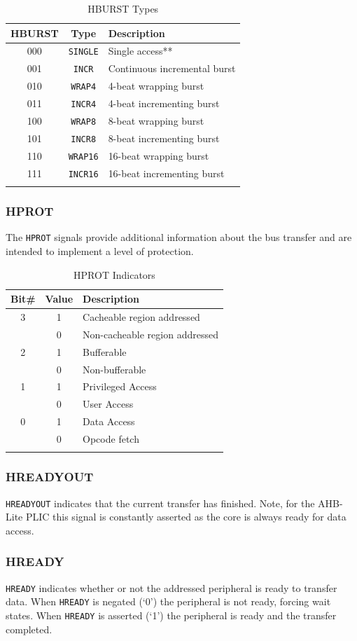 \documentclass[]{article}
\begin{document}
\begin{longtable}[]{@{}ccl@{}}
\toprule
\textbf{HBURST} & \textbf{Type} & \textbf{Description}\tabularnewline
\midrule
\endhead
000 & \texttt{SINGLE} & Single access**\tabularnewline
001 & \texttt{INCR} & Continuous incremental burst\tabularnewline
010 & \texttt{WRAP4} & 4-beat wrapping burst\tabularnewline
011 & \texttt{INCR4} & 4-beat incrementing burst\tabularnewline
100 & \texttt{WRAP8} & 8-beat wrapping burst\tabularnewline
101 & \texttt{INCR8} & 8-beat incrementing burst\tabularnewline
110 & \texttt{WRAP16} & 16-beat wrapping burst\tabularnewline
111 & \texttt{INCR16} & 16-beat incrementing burst\tabularnewline
\bottomrule
\caption{HBURST Types}
\label{tab:HBURST}
\end{longtable}

\subsubsection{HPROT}

The \texttt{HPROT} signals provide additional information about the bus
transfer and are intended to implement a level of protection.

\begin{longtable}[]{@{}ccl@{}}
\toprule
\textbf{Bit\#} & \textbf{Value} & \textbf{Description}\tabularnewline
\midrule
\endhead
3 & 1 & Cacheable region addressed\tabularnewline
& 0 & Non-cacheable region addressed\tabularnewline
2 & 1 & Bufferable\tabularnewline
& 0 & Non-bufferable\tabularnewline
1 & 1 & Privileged Access\tabularnewline
& 0 & User Access\tabularnewline
0 & 1 & Data Access\tabularnewline
& 0 & Opcode fetch\tabularnewline
\bottomrule
\caption{HPROT Indicators}
\label{tab:HPROT}
\end{longtable}

\subsubsection{HREADYOUT}

\texttt{HREADYOUT} indicates that the current transfer has finished.
Note, for the AHB-Lite PLIC this signal is constantly asserted as the
core is always ready for data access.

\subsubsection{HREADY}

\texttt{HREADY} indicates whether or not the addressed peripheral is
ready to transfer data. When \texttt{HREADY} is negated (`0') the
peripheral is not ready, forcing wait states. When \texttt{HREADY} is
asserted (`1') the peripheral is ready and the transfer completed.
\end{document}
